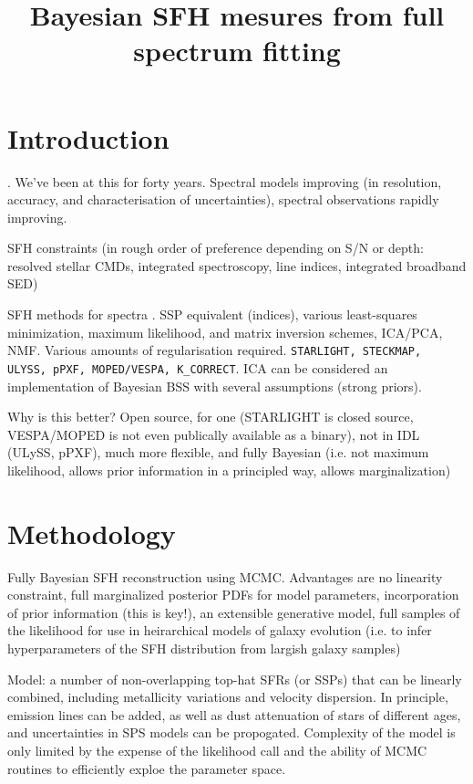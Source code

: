 \title{Bayesian SFH mesures from full spectrum fitting}


\section{Introduction}
\citet{tinsley68}.  We've been at this for forty years. Spectral models improving (in resolution, accuracy, and characterisation of uncertainties), spectral observations rapidly improving.

SFH constraints (in rough order of preference depending on S/N or depth: resolved stellar CMDs, integrated spectroscopy, line indices, integrated broadband SED)

SFH methods for spectra \citep{walcher2011}.  SSP equivalent (indices), various least-squares minimization, maximum likelihood, and matrix inversion schemes, ICA/PCA, NMF. Various amounts of regularisation required. \texttt{STARLIGHT, STECKMAP, ULYSS, pPXF, MOPED/VESPA, K_CORRECT}. ICA can be considered an implementation of Bayesian BSS with several assumptions (strong priors).

Why is this better?   Open source, for one (STARLIGHT is closed source, VESPA/MOPED is not even publically available as a binary), not in IDL (ULySS, pPXF), much more flexible, and fully Bayesian (i.e. not maximum likelihood, allows prior information in a principled way, allows marginalization)

\section{Methodology}
Fully Bayesian SFH reconstruction using MCMC.  Advantages are no linearity constraint, full marginalized posterior PDFs for model parameters, incorporation of prior information (this is key!), an extensible generative model, full samples of the likelihood for use in heirarchical models of galaxy evolution (i.e. to infer hyperparameters of the SFH distribution from largish galaxy samples)

Model:  a number of non-overlapping top-hat SFRs (or SSPs) that can be linearly combined, including metallicity variations and velocity dispersion.  In principle, emission lines can be added, as well as dust attenuation of stars of different ages, and uncertainties in SPS models can be propogated.  Complexity of the model is only limited by the expense of the likelihood call and the ability of MCMC routines to efficiently exploe the parameter space.

